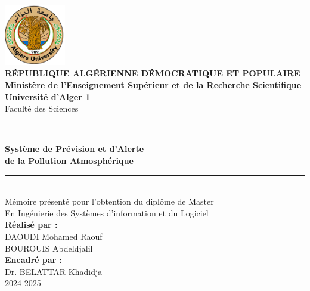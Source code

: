 \documentclass[12pt,a4paper]{report}
\begin{document}
\begin{titlepage}
\begin{center}
    \includegraphics[width=0.2\textwidth]{logo_universite.png}\\[1cm]
    
    {\Large \textbf{RÉPUBLIQUE ALGÉRIENNE DÉMOCRATIQUE ET POPULAIRE}}\\[0.5cm]
    {\large \textbf{Ministère de l'Enseignement Supérieur et de la Recherche Scientifique}}\\[0.5cm]
    {\large \textbf{Université d'Alger 1}}\\
    {\large Faculté des Sciences}\\[0.5cm]

    \rule{\linewidth}{0.5mm} \\[0.4cm]
    {\Huge \textbf{Système de Prévision et d’Alerte\\ de la Pollution Atmosphérique}}\\[0.4cm]
    \rule{\linewidth}{0.5mm} \\[1cm]
    
    {\large Mémoire présenté pour l’obtention du diplôme de Master}\\
    {\large En Ingénierie des Systèmes d’information et du Logiciel}\\[1cm]

    \textbf{Réalisé par :}\\
    {\large DAOUDI Mohamed Raouf\\
    BOUROUIS Abdeldjalil}\\[1cm]

    \textbf{Encadré par :}\\
    {\large Dr. BELATTAR Khadidja}\\[1cm]
    
    {\large 2024-2025}
\end{center}
\end{titlepage}

\newpage
\thispagestyle{empty}
\mbox{}
\end{document}
